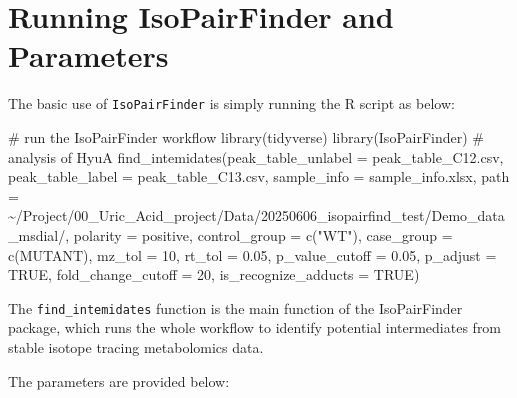 \documentclass[
  letterpaper,
  DIV=11,
  numbers=noendperiod]{scrreprt}
\newenvironment{Shaded}{\begin{snugshade}}{\end{snugshade}}
\newcommand{\AttributeTok}[1]{\textcolor[rgb]{0.40,0.45,0.13}{#1}}
\newcommand{\CommentTok}[1]{\textcolor[rgb]{0.37,0.37,0.37}{#1}}
\newcommand{\ConstantTok}[1]{\textcolor[rgb]{0.56,0.35,0.01}{#1}}
\newcommand{\DecValTok}[1]{\textcolor[rgb]{0.68,0.00,0.00}{#1}}
\newcommand{\FloatTok}[1]{\textcolor[rgb]{0.68,0.00,0.00}{#1}}
\newcommand{\FunctionTok}[1]{\textcolor[rgb]{0.28,0.35,0.67}{#1}}
\newcommand{\NormalTok}[1]{\textcolor[rgb]{0.00,0.23,0.31}{#1}}
\newcommand{\StringTok}[1]{\textcolor[rgb]{0.13,0.47,0.30}{#1}}
\begin{document}
\section{Running IsoPairFinder and
Parameters}\label{sec-isoPairFinder-parameters}

The basic use of \texttt{IsoPairFinder} is simply running the R script
as below:

\begin{Shaded}
\begin{Highlighting}[]
\CommentTok{\# run the IsoPairFinder workflow}
\FunctionTok{library}\NormalTok{(tidyverse)}
\FunctionTok{library}\NormalTok{(IsoPairFinder)}
\CommentTok{\# analysis of HyuA}
\FunctionTok{find\_intemidates}\NormalTok{(}\AttributeTok{peak\_table\_unlabel =} \StringTok{\textquotesingle{}peak\_table\_C12.csv\textquotesingle{}}\NormalTok{,}
                 \AttributeTok{peak\_table\_label =} \StringTok{\textquotesingle{}peak\_table\_C13.csv\textquotesingle{}}\NormalTok{,}
                 \AttributeTok{sample\_info =} \StringTok{\textquotesingle{}sample\_info.xlsx\textquotesingle{}}\NormalTok{,}
                 \AttributeTok{path =} \StringTok{\textquotesingle{}\textasciitilde{}/Project/00\_Uric\_Acid\_project/Data/20250606\_isopairfind\_test/Demo\_data\_msdial/\textquotesingle{}}\NormalTok{,}
                 \AttributeTok{polarity =} \StringTok{\textquotesingle{}positive\textquotesingle{}}\NormalTok{,}
                 \AttributeTok{control\_group =} \FunctionTok{c}\NormalTok{(}\StringTok{"WT"}\NormalTok{),}
                 \AttributeTok{case\_group =} \FunctionTok{c}\NormalTok{(}\StringTok{\textquotesingle{}MUTANT\textquotesingle{}}\NormalTok{),}
                 \AttributeTok{mz\_tol =} \DecValTok{10}\NormalTok{,}
                 \AttributeTok{rt\_tol =} \FloatTok{0.05}\NormalTok{,}
                 \AttributeTok{p\_value\_cutoff =} \FloatTok{0.05}\NormalTok{,}
                 \AttributeTok{p\_adjust =} \ConstantTok{TRUE}\NormalTok{,}
                 \AttributeTok{fold\_change\_cutoff =} \DecValTok{20}\NormalTok{,}
                 \AttributeTok{is\_recognize\_adducts =} \ConstantTok{TRUE}\NormalTok{)}
\end{Highlighting}
\end{Shaded}

The \texttt{find\_intemidates} function is the main function of the
IsoPairFinder package, which runs the whole workflow to identify
potential intermediates from stable isotope tracing metabolomics data.

The parameters are provided below:
\end{document}
